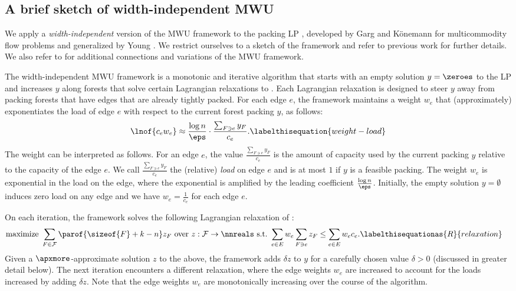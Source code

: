 \documentclass{toc}
\newcommand{\costof}[1]{c_{#1}}
\newcommand{\capacityof}{\costof}%
\newcommand{\forests}{\mathcal{F}} %
\newcommand{\weight}[1]{w_{#1}}
\newcommand{\wrt}{with respect to\xspace} %
\begin{document}
\subsection{A brief sketch of width-independent MWU}


We apply a \emph{width-independent} version of the MWU framework to
the packing LP , developed by Garg and
%
K\"onemann %
\cite{gk-07} for multicommodity flow problems and generalized by Young
\cite{young-01}. We restrict ourselves to a sketch of the framework
and refer to previous work for further details. %
We also refer to \cite{AHK} for additional connections and variations
of the MWU framework. %

The width-independent MWU framework is a monotonic and iterative
algorithm that starts with an empty solution $y = \zeroes$ to the LP
 and increases $y$ along forests that
solve certain Lagrangian relaxations to
. Each Lagrangian relaxation is designed
to steer $y$ away from packing forests that have edges that are
already tightly packed. For each edge $e$, the framework maintains a
weight $\weight{e}$ that (approximately) exponentiates the load of
edge $e$ \wrt the current forest packing $y$, as follows:
\begin{align*}
  \lnof{\capacityof{e} \weight{e}}  %
  \approx %
  \frac{\log n}{\eps}\cdot \frac{\sum_{F \ni e} y_F}{\capacityof{e}}. %
  \labelthisequation{weight-load}
\end{align*}
The weight can be interpreted as follows.  For an edge $e$, the value
$\frac{\sum_{F \ni e} y_F}{\capacityof{e}}$ is the amount of capacity
used by the current packing $y$ relative to the capacity of the edge
$e$. We call $\frac{\sum_{F \ni e} y_F}{\capacityof{e}}$ the
(relative) \emph{load} on edge $e$ and is at most $1$ if $y$ is a
feasible packing. The weight $\weight{e}$ is exponential in the load
on the edge, where the exponential is amplified by the leading
coefficient $\frac{\log n}{\eps}$.  Initially, the empty solution
$y = \emptyset$ induces zero load on any edge and we have
$\weight{e} = \frac{1}{\capacityof{e}}$ for each edge $e$.

On each iteration, the framework solves the following Lagrangian
relaxation of :
\begin{align*}
  \text{maximize }              %
  & \sum_{F \in \forests} \parof{\sizeof{F} + k - n}
    z_F \text{ over } z: \forests \to \nnreals %
    \text{ s.t.\ }
    \sum_{e \in E} \weight{e} \sum_{F \ni e} z_F %
    \leq                                         %
    \sum_{e \in E} \weight{e} \capacityof{e}.
    \labelthisequationas{R}{relaxation}
\end{align*}
Given a $\apxmore$-approximate solution $z$ to the above, the
framework adds $\delta z$ to $y$ for a carefully chosen value
$\delta > 0$ (discussed in greater detail below). The next iteration
encounters a different relaxation, where the edge weights $\weight{e}$
are increased to account for the loads increased by adding
$\delta z$. Note that the edge weights $\weight{e}$ are monotonically
increasing over the course of the algorithm.
\end{document}
